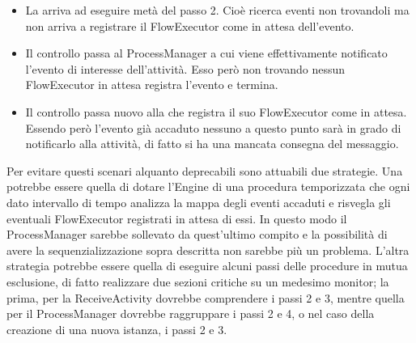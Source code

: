 \begin{itemize}
  \item La  arriva ad eseguire metà del passo 2. Cioè
  ricerca eventi non trovandoli ma non arriva a registrare il FlowExecutor come
  in attesa dell'evento.
  \item Il controllo passa al ProcessManager a cui viene effettivamente
  notificato l'evento di interesse dell'attività. Esso però non trovando
  nessun FlowExecutor in attesa registra l'evento e termina.
  \item Il controllo passa nuovo alla  che registra il
  suo FlowExecutor come in attesa. Essendo però l'evento già accaduto nessuno a
  questo punto sarà in grado di notificarlo alla attività, di fatto si ha una
  mancata consegna del messaggio.
\end{itemize}

Per evitare questi scenari alquanto deprecabili sono attuabili due strategie.
Una potrebbe essere quella di dotare l'Engine di una procedura temporizzata che
ogni dato intervallo di tempo analizza la mappa degli eventi accaduti e risvegla
gli eventuali FlowExecutor registrati in attesa di essi. In questo modo il
ProcessManager sarebbe sollevato da quest'ultimo compito e la possibilità di
avere la sequenzializzazione sopra descritta non sarebbe più un problema.
L'altra strategia potrebbe essere quella di eseguire alcuni passi delle
procedure in mutua esclusione, di fatto realizzare due sezioni critiche su un
medesimo monitor; la prima, per la ReceiveActivity dovrebbe comprendere i passi
2 e 3, mentre quella per il ProcessManager dovrebbe raggruppare i passi 2 e 4, o
nel caso della creazione di una nuova istanza, i passi 2 e 3.


